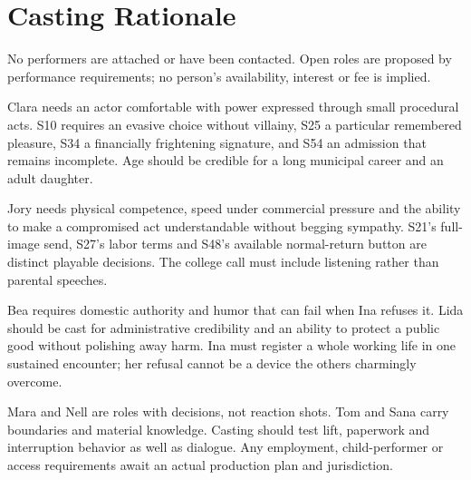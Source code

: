 \section{Casting Rationale}
No performers are attached or have been contacted. Open roles are proposed by performance requirements; no person's availability, interest or fee is implied.

Clara needs an actor comfortable with power expressed through small procedural acts. S10 requires an evasive choice without villainy, S25 a particular remembered pleasure, S34 a financially frightening signature, and S54 an admission that remains incomplete. Age should be credible for a long municipal career and an adult daughter.

Jory needs physical competence, speed under commercial pressure and the ability to make a compromised act understandable without begging sympathy. S21's full-image send, S27's labor terms and S48's available normal-return button are distinct playable decisions. The college call must include listening rather than parental speeches.

Bea requires domestic authority and humor that can fail when Ina refuses it. Lida should be cast for administrative credibility and an ability to protect a public good without polishing away harm. Ina must register a whole working life in one sustained encounter; her refusal cannot be a device the others charmingly overcome.

Mara and Nell are roles with decisions, not reaction shots. Tom and Sana carry boundaries and material knowledge. Casting should test lift, paperwork and interruption behavior as well as dialogue. Any employment, child-performer or access requirements await an actual production plan and jurisdiction.
